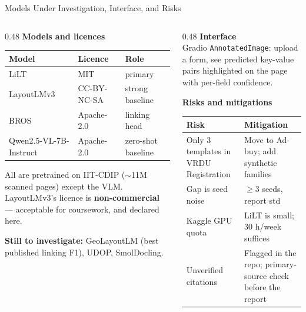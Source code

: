 \documentclass[aspectratio=169, 11pt]{beamer}
\begin{document}
\begin{frame}{Models Under Investigation, Interface, and Risks}
  \begin{columns}[T]
    \begin{column}{0.48\textwidth}
      \textbf{Models and licences}
      \smallskip

      \scriptsize
      \begin{tabular}{@{}>{\raggedright\arraybackslash}p{2.3cm}l>{\raggedright\arraybackslash}p{2.0cm}@{}}
        \toprule
        Model & Licence & Role\\
        \midrule
        LiLT & MIT & primary\\
        LayoutLMv3 & \textcolor{warn}{CC-BY-NC-SA} & strong baseline\\
        BROS & Apache-2.0 & linking head\\
        Qwen2.5-VL-7B-Instruct & Apache-2.0 & zero-shot baseline\\
        \bottomrule
      \end{tabular}
      \smallskip

      {\footnotesize All are pretrained on IIT-CDIP ($\sim$11M scanned pages) except the VLM.
      LayoutLMv3's licence is \textbf{non-commercial} — acceptable for coursework, and declared here.
      \smallskip

      \textbf{Still to investigate:} GeoLayoutLM (best published linking F1), UDOP, SmolDocling.}
    \end{column}
    \begin{column}{0.48\textwidth}
      \textbf{Interface}\\
      {\footnotesize Gradio \texttt{AnnotatedImage}: upload a form, see predicted key-value pairs
      highlighted on the page with per-field confidence.}
      \smallskip

      \textbf{Risks and mitigations}
      \scriptsize
      \begin{tabular}{@{}p{2.2cm}p{3.0cm}@{}}
        \toprule
        Risk & Mitigation\\
        \midrule
        Only 3 templates in VRDU Registration & Move to Ad-buy; add synthetic families\\
        Gap is seed noise & $\geq$3 seeds, report std\\
        Kaggle GPU quota & LiLT is small; 30 h/week suffices\\
        Unverified citations & Flagged in the repo; primary-source check before the report\\
        \bottomrule
      \end{tabular}
    \end{column}
  \end{columns}
\end{frame}
\end{document}
